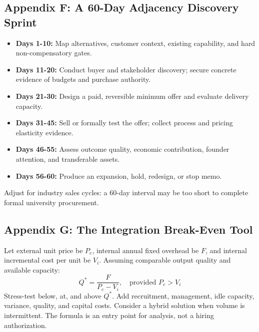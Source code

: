 \subsection*{Appendix F: A 60-Day Adjacency Discovery Sprint}
\label{sec:appendix_f_sixty_day_discovery_sprint}

\begin{itemize}
    \item \textbf{Days 1-10:} Map alternatives, customer context, existing capability, and hard non-compensatory gates.
    \item \textbf{Days 11-20:} Conduct buyer and stakeholder discovery; secure concrete evidence of budgets and purchase authority.
    \item \textbf{Days 21-30:} Design a paid, reversible minimum offer and evaluate delivery capacity.
    \item \textbf{Days 31-45:} Sell or formally test the offer; collect process and pricing elasticity evidence.
    \item \textbf{Days 46-55:} Assess outcome quality, economic contribution, founder attention, and transferable assets.
    \item \textbf{Days 56-60:} Produce an expansion, hold, redesign, or stop memo.
\end{itemize}
Adjust for industry sales cycles: a 60-day interval may be too short to complete formal university procurement.

\subsection*{Appendix G: The Integration Break-Even Tool}
\label{sec:appendix_g_integration_breakeven_tool}

Let external unit price be $P_e$, internal annual fixed overhead be $F$, and internal incremental cost per unit be $V_i$. Assuming comparable output quality and available capacity:
\begin{equation}
\label{eq:appendix_breakeven_formula}
Q^* = \frac{F}{P_e - V_i}, \quad \text{provided } P_e > V_i
\end{equation}
Stress-test below, at, and above $Q^*$. Add recruitment, management, idle capacity, variance, quality, and capital costs. Consider a hybrid solution when volume is intermittent. The formula is an entry point for analysis, not a hiring authorization.

